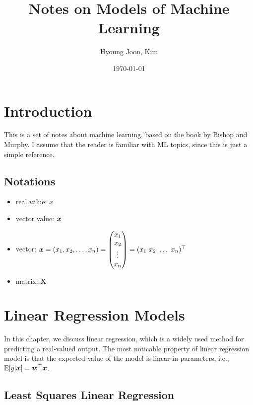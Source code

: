\documentclass{report}
\title{Notes on Models of Machine Learning}
\author{Hyoung Joon, Kim}
\date{\today}
\begin{document}
\maketitle
\tableofcontents
\newpage

\chapter{Introduction}
This is a set of notes about machine learning, based on the book by Bishop and Murphy.
I assume that the reader is familiar with ML topics, since this is just a simple reference.

    \section{Notations}
        \begin{itemize}
            \item real value: $x$
            \item vector value: $\boldsymbol{x}$
            \item vector: $\boldsymbol{x} = (x_1, x_2, \ldots, x_n)
            = 
            \begin{pmatrix}
                x_1 \\
                x_2 \\
                \vdots \\
                x_n    
            \end{pmatrix}
            =
            (x_1\ x_2\ \ldots\ x_n)^\top
            $
            \item matrix: $\textbf{X}$
        \end{itemize}

\chapter{Linear Regression Models}
    In this chapter, we discuss linear regression, which is a widely used method for predicting a real-valued output.
    The most noticable property of linear regression model is that the expected value of the model is linear in parameters,
    i.e., $\mathbb{E}[y|\boldsymbol{x}]=\boldsymbol{w}^{\top}\boldsymbol{x}$.

    \section{Least Squares Linear Regression}
\end{document}
